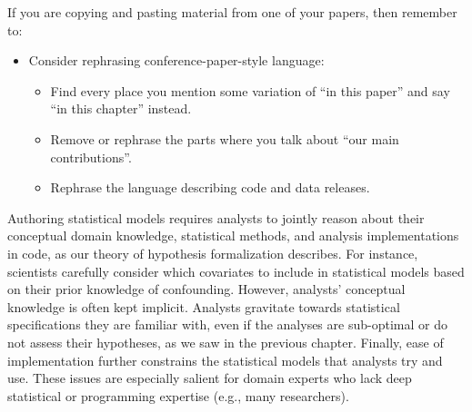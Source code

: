 \def\adult{\texttt{adult}\xspace}
\def\poundslost{\texttt{pounds\_lost}\xspace}
\def\motivation{\texttt{motivation}\xspace}
\def\regimen{\texttt{regimen\_condition}\xspace}
\def\regimencondition{\texttt{regimen\_condition}\xspace}
\def\group{\texttt{group}\xspace}
\def\age{\texttt{age}\xspace}

If you are copying and pasting material from one of your papers, then remember to:
\begin{itemize}
    \item Consider rephrasing conference-paper-style language:
    \begin{itemize}
        \item Find every place you mention some variation of ``in this paper'' and say ``in this chapter'' instead.
        \item Remove or rephrase the parts where you talk about ``our main contributions''.
        \item Rephrase the language describing code and data releases.
    \end{itemize}
\end{itemize}

Authoring statistical models requires analysts to jointly reason about their
conceptual domain knowledge, statistical methods, and analysis implementations
in code, as our theory of hypothesis formalization describes. For instance,
scientists carefully consider which covariates to include in statistical models
based on their prior knowledge of confounding. However, analysts' conceptual
knowledge is often kept implicit. Analysts gravitate towards statistical
specifications they are familiar with, even if the analyses are sub-optimal or
do not assess their hypotheses, as we saw in the previous chapter. Finally, ease
of implementation further constrains the statistical models that analysts try
and use. These issues are especially salient for domain experts who lack deep
statistical or programming expertise (e.g., many researchers).

